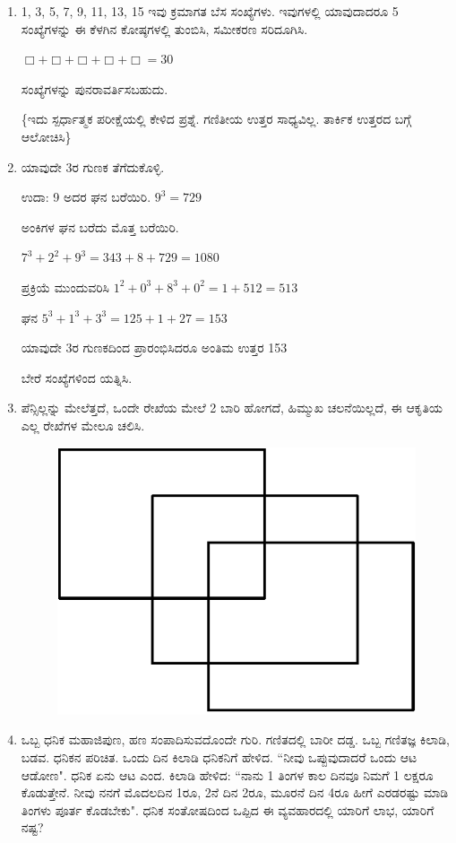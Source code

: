 \begin{enumerate}
\item 1, 3, 5, 7, 9, 11, 13, 15 ಇವು ಕ್ರಮಾಗತ ಬೆಸ ಸಂಖ್ಯೆಗಳು. ಇವುಗಳಲ್ಲಿ ಯಾವುದಾದರೂ 5 ಸಂಖ್ಯೆಗಳನ್ನು ಈ ಕೆಳಗಿನ ಕೋಷ್ಠಗಳಲ್ಲಿ ತುಂಬಿಸಿ, ಸಮೀಕರಣ ಸರಿದೂಗಿಸಿ. 

$\Box + \Box + \Box + \Box + \Box = 30$

ಸಂಖ್ಯೆಗಳನ್ನು ಪುನರಾವರ್ತಿಸಬಹುದು. 

\{ಇದು ಸ್ಪರ್ಧಾತ್ಮಕ ಪರೀಕ್ಷೆಯಲ್ಲಿ ಕೇಳಿದ ಪ್ರಶ್ನೆ. ಗಣಿತೀಯ ಉತ್ತರ ಸಾಧ್ಯವಿಲ್ಲ. ತಾರ್ಕಿಕ ಉತ್ತರದ ಬಗ್ಗೆ ಆಲೋಚಿಸಿ\}

\item ಯಾವುದೇ 3ರ ಗುಣಕ ತೆಗೆದುಕೊಳ್ಳಿ. 

ಉದಾ: 9 ಅದರ ಘನ ಬರೆಯಿರಿ. $9^{3} = 729$

ಅಂಕಿಗಳ ಘನ ಬರೆದು ಮೊತ್ತ ಬರೆಯಿರಿ. 

$7^{3} + 2^{2} + 9^{3} = 343 + 8 + 729 = 1080$

ಪ್ರಕ್ರಿಯೆ ಮುಂದುವರಿಸಿ $1^{2} + 0^{3} + 8^{3} + 0^{2} = 1 + 512 = 513$

ಘನ $5^{3} + 1^{3} + 3^{3} = 125 + 1 + 27 = 153$

ಯಾವುದೇ 3ರ ಗುಣಕದಿಂದ ಪ್ರಾರಂಭಿಸಿದರೂ ಅಂತಿಮ ಉತ್ತರ 153

ಬೇರೆ ಸಂಖ್ಯೆಗಳಿಂದ ಯತ್ನಿಸಿ. 

\item ಪೆನ್ಸಿಲ್ಲನ್ನು ಮೇಲೆತ್ತದೆ, ಒಂದೇ ರೇಖೆಯ ಮೇಲೆ 2 ಬಾರಿ ಹೋಗದೆ, ಹಿಮ್ಮುಖ ಚಲನೆಯಿಲ್ಲದೆ, ಈ ಆಕೃತಿಯ ಎಲ್ಲ ರೇಖೆಗಳ ಮೇಲೂ ಚಲಿಸಿ. 
\begin{figure}[H]
\centering
\includegraphics{images/chap8/q24.eps}
\end{figure}

\item ಒಬ್ಬ ಧನಿಕ ಮಹಾಜಿಪುಣ, ಹಣ ಸಂಪಾದಿಸುವದೊಂದೇ ಗುರಿ. ಗಣಿತದಲ್ಲಿ ಬಾರೀ ದಡ್ಡ. ಒಬ್ಬ ಗಣಿತಜ್ಞ ಕಿಲಾಡಿ, ಬಡವ. ಧನಿಕನ ಪರಿಚಿತ. ಒಂದು ದಿನ ಕಿಲಾಡಿ ಧನಿಕನಿಗೆ ಹೇಳಿದ. ``ನೀವು ಒಪ್ಪುವುದಾದರೆ ಒಂದು ಆಟ ಆಡೋಣ". ಧನಿಕ ಏನು ಆಟ ಎಂದ. ಕಿಲಾಡಿ ಹೇಳಿದ: ``ನಾನು 1 ತಿಂಗಳ ಕಾಲ ದಿನವೂ ನಿಮಗೆ 1 ಲಕ್ಷರೂ ಕೊಡುತ್ತೇನೆ. ನೀವು ನನಗೆ ಮೊದಲದಿನ 1ರೂ, 2ನೆ ದಿನ 2ರೂ, ಮೂರನೆ ದಿನ 4ರೂ ಹೀಗೆ ಎರಡರಷ್ಟು ಮಾಡಿ ತಿಂಗಳು ಪೂರ್ತ ಕೊಡಬೇಕು". ಧನಿಕ ಸಂತೋಷದಿಂದ ಒಪ್ಪಿದ ಈ ವ್ಯವಹಾರದಲ್ಲಿ ಯಾರಿಗೆ ಲಾಭ, ಯಾರಿಗೆ ನಷ್ಟ? 


\end{enumerate}
